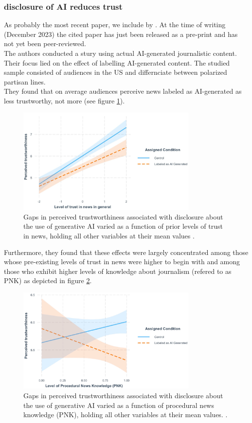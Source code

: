 \documentclass[
  a4paper,  %
  twoside,  %
  bibliography=totoc,
  headsepline,
  cleardoublepage=empty,
  parskip=half,
  draft=false
]{scrbook}
\begin{document}
\subsubsection*{disclosure of AI reduces trust}
As probably the most recent paper, we include  by \citeauthor{toffTheyCouldJust2023}. At the time of writing (December 2023) the cited paper has just been released as a pre-print and has not yet been peer-reviewed. \\
The authors conducted a stury using actual AI-generated journalistic content. Their focus lied on the effect of labelling AI-generated content. The studied sample consisted of audiences in the US and differnciate between polarized partisan lines. \\
They found that on average audiences perceive news labeled as AI-generated as less trustworthy, not more (see figure \ref{fig:toff-trust}). 
\begin{figure}[h]
  \centering
  \includegraphics[width=0.8\textwidth]{./graphics/toff/Trust in news.png}
  \caption{Gaps in perceived trustworthiness associated with disclosure about the use of generative AI varied as a function of prior levels of trust in news, holding all other variables at their mean values \cite{toffTheyCouldJust2023}.}
  \label{fig:toff-trust}
\end{figure}
Furthermore, they found that these effects were largely concentrated among those whose pre-existing levels of trust in news were higher to begin with and among those who exhibit higher levels of knowledge about journalism (refered to as PNK) as depicted in figure \ref{fig:toff-PNK}.
\begin{figure}[h]
  \centering
  \includegraphics[width=0.8\textwidth]{./graphics/toff/PNK.png}
  \caption{Gaps in perceived trustworthiness associated with disclosure about the use of generative AI varied as a function of procedural news knowledge (PNK), holding all other variables at their mean values. \cite{toffTheyCouldJust2023}.}
  \label{fig:toff-PNK}
\end{figure}
\end{document}
